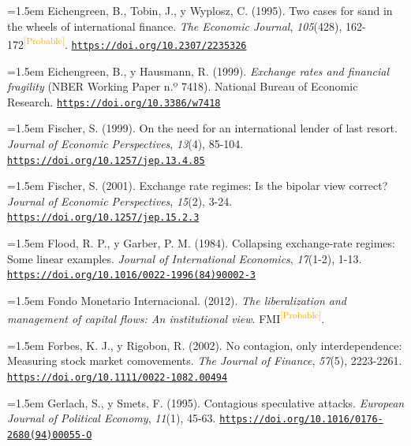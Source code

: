 \documentclass[10pt,a4paper]{article}
\begin{document}
\noindent\hangindent=1.5em Eichengreen, B., Tobin, J., y Wyplosz, C. (1995). Two cases for sand in the wheels of international finance. \textit{The Economic Journal}, \textit{105}(428), 162-172\textcolor{orange}{\textsuperscript{[Probable]}}. \href{https://doi.org/10.2307/2235326}{\nolinkurl{https://doi.org/10.2307/2235326}}

\noindent\hangindent=1.5em Eichengreen, B., y Hausmann, R. (1999). \textit{Exchange rates and financial fragility} (NBER Working Paper n.º 7418). National Bureau of Economic Research. \href{https://doi.org/10.3386/w7418}{\nolinkurl{https://doi.org/10.3386/w7418}}

\noindent\hangindent=1.5em Fischer, S. (1999). On the need for an international lender of last resort. \textit{Journal of Economic Perspectives}, \textit{13}(4), 85-104. \href{https://doi.org/10.1257/jep.13.4.85}{\nolinkurl{https://doi.org/10.1257/jep.13.4.85}}

\noindent\hangindent=1.5em Fischer, S. (2001). Exchange rate regimes: Is the bipolar view correct? \textit{Journal of Economic Perspectives}, \textit{15}(2), 3-24. \href{https://doi.org/10.1257/jep.15.2.3}{\nolinkurl{https://doi.org/10.1257/jep.15.2.3}}

\noindent\hangindent=1.5em Flood, R. P., y Garber, P. M. (1984). Collapsing exchange-rate regimes: Some linear examples. \textit{Journal of International Economics}, \textit{17}(1-2), 1-13. \href{https://doi.org/10.1016/0022-1996(84)90002-3}{\nolinkurl{https://doi.org/10.1016/0022-1996(84)90002-3}}

\noindent\hangindent=1.5em Fondo Monetario Internacional. (2012). \textit{The liberalization and management of capital flows: An institutional view}. FMI\textcolor{orange}{\textsuperscript{[Probable]}}.

\noindent\hangindent=1.5em Forbes, K. J., y Rigobon, R. (2002). No contagion, only interdependence: Measuring stock market comovements. \textit{The Journal of Finance}, \textit{57}(5), 2223-2261. \href{https://doi.org/10.1111/0022-1082.00494}{\nolinkurl{https://doi.org/10.1111/0022-1082.00494}}

\noindent\hangindent=1.5em Gerlach, S., y Smets, F. (1995). Contagious speculative attacks. \textit{European Journal of Political Economy}, \textit{11}(1), 45-63. \href{https://doi.org/10.1016/0176-2680(94)00055-O}{\nolinkurl{https://doi.org/10.1016/0176-2680(94)00055-O}}
\end{document}
